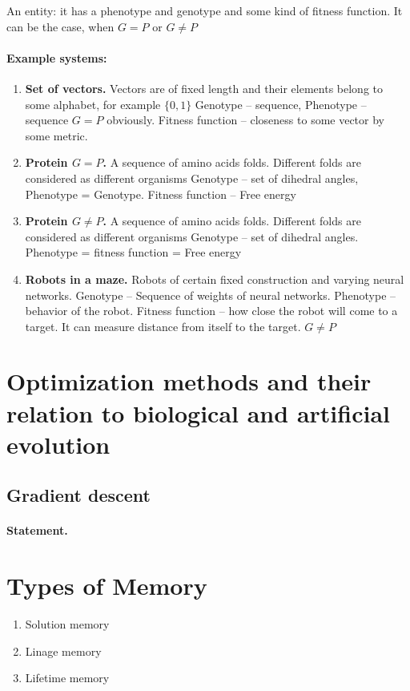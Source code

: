\documentclass[12pt]{paper}
\begin{document}
 An entity: it has a phenotype and genotype and some kind of fitness function. It can be the case, 
when $G=P$ or $G\neq P$
 \paragraph{Example systems:}
\begin{enumerate}
 \item \textbf{Set of vectors.} Vectors are of fixed length and their elements belong to some 
alphabet, for example $\{0,1\}$
  \subitem Genotype -- sequence, Phenotype -- sequence $G=P$ obviously. Fitness function -- 
closeness to some vector by some metric.
  \item \textbf{Protein $G=P$.} A sequence of amino acids folds. Different folds are considered as 
different organisms
  \subitem Genotype -- set of dihedral angles, Phenotype = Genotype. Fitness function -- Free energy
  \item \textbf{Protein $G\neq P$.} A sequence of amino acids folds. Different folds are considered 
as different organisms
  \subitem Genotype -- set of dihedral angles. Phenotype = fitness function = Free energy
  \item \textbf{Robots in a maze.} Robots of certain fixed construction and varying neural networks.
  \subitem Genotype -- Sequence of weights of neural networks. Phenotype -- behavior of the robot. 
Fitness function -- how close the robot will come to a target. It can measure distance from 
itself to the target. $G\neq P$
\end{enumerate}

 
 
 \section{Optimization methods and their relation to biological and artificial evolution}
 
 \subsection{Gradient descent}
 
 \paragraph{Statement.} 

\section{Types of Memory}
\begin{enumerate}
 \item Solution memory
 \item Linage memory
 \item Lifetime memory
\end{enumerate}
\end{document}
